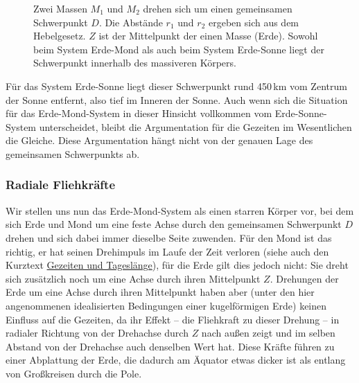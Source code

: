 \begin{figure}[htb]
%
\caption{\label{fig_Schwerpunkt}%
Zwei Massen $M_1$ und $M_2$ drehen sich um einen gemeinsamen Schwerpunkt $D$. Die
Abst\"ande $r_1$ und $r_2$ ergeben sich aus dem Hebelgesetz. $Z$ ist der Mittelpunkt der
einen Masse (Erde). Sowohl beim System Erde-Mond als auch beim System Erde-Sonne liegt
der Schwerpunkt innerhalb des massiveren K\"orpers.}
\end{figure}

F\"ur das System Erde-Sonne liegt dieser Schwerpunkt 
rund 450\,km vom
Zentrum der Sonne entfernt, also tief im Inneren der Sonne. Auch wenn sich die Situation f\"ur
das Erde-Mond-System in dieser Hinsicht vollkommen vom Erde-Sonne-System unterscheidet, bleibt
die Argumentation f\"ur die Gezeiten im Wesentlichen die Gleiche. Diese Argumentation h\"angt nicht
von der genauen Lage des gemeinsamen Schwerpunkts ab.  

\subsubsection{Radiale Fliehkr\"afte}

Wir stellen uns nun das Erde-Mond-System als einen starren K\"orper vor, bei dem sich Erde
und Mond um eine feste Achse durch den gemeinsamen Schwerpunkt $D$ drehen und sich dabei
immer dieselbe Seite zuwenden. F\"ur den Mond ist das richtig, er hat seinen Drehimpuls im Laufe
der Zeit verloren (siehe auch den Kurztext \glqq\hyperref[chap_Gezeiten2]{Gezeiten und Tagesl\"ange}\grqq), 
f\"ur die Erde gilt dies jedoch nicht: Sie dreht sich
zus\"atzlich noch um eine Achse durch ihren Mittelpunkt $Z$. Drehungen der Erde um eine Achse
durch ihren Mittelpunkt haben aber (unter den hier angenommenen idealisierten Bedingungen einer
kugelf\"ormigen Erde) keinen Einfluss auf die Gezeiten, da ihr Effekt -- die Fliehkraft zu dieser Drehung -- 
in radialer Richtung von der Drehachse durch $Z$ nach au\ss en zeigt und im selben Abstand von der
Drehachse auch denselben Wert hat. Diese Kr\"afte f\"uhren zu einer Abplattung der Erde, die dadurch am 
\"Aquator etwas dicker ist als entlang von Gro\ss kreisen durch die Pole. 

